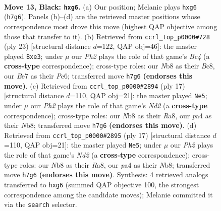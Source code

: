 \documentclass[11pt]{article}
\begin{document}
\clearpage

\begin{figure}[p]\centering
\begin{subfigure}{0.46\textwidth}\centering
\resizebox{\linewidth}{!}{%
\newchessgame
\chessboard[
  setfen={rnbq1rk1/pp1nb2p/4p1P1/8/P2P2P1/2N2N2/1P3P2/R1BQKB1R b KQ - 0 13},
  showmover=false,
  pgfstyle=straightmove, color=movearrow, markmove={h7-g6}
]}
\caption{}
\end{subfigure}\hfill
\begin{subfigure}{0.46\textwidth}\centering
\resizebox{\linewidth}{!}{%
\newchessgame
\chessboard[
  setfen={r1bq1rk1/pp1n2pp/4p3/2b1P3/8/4PN2/PPQN2PP/R3KB1R b KQ - 3 12},
  showmover=false,
  pgfstyle=straightmove, color=movearrow, markmove={c5-e3}
]}
\caption{}
\end{subfigure}
\\[4pt]
\begin{subfigure}{0.46\textwidth}\centering
\resizebox{\linewidth}{!}{%
\newchessgame
\chessboard[
  setfen={rnbqk2r/pp1nppbp/4P1p1/8/3N4/2N5/PPP3PP/R1BQKB1R b KQkq - 0 9},
  showmover=false,
  pgfstyle=straightmove, color=movearrow, markmove={d7-e5}
]}
\caption{}
\end{subfigure}\hfill
\begin{subfigure}{0.46\textwidth}\centering
\resizebox{\linewidth}{!}{%
\newchessgame
\chessboard[
  setfen={rnbqk2r/pp1nppbp/4P1p1/8/3N4/2N5/PPP3PP/R1BQKB1R b KQkq - 0 9},
  showmover=false,
  pgfstyle=straightmove, color=movearrow, markmove={d7-e5}
]}
\caption{}
\end{subfigure}
\caption{\textbf{Move 13, Black: \texttt{hxg6}.} (a) Our position; Melanie plays \texttt{hxg6} (\texttt{h7g6}). Panels (b)--(d) are the retrieved master positions whose correspondence most drove this move (highest QAP objective among those that transfer to it). (b) Retrieved from \texttt{ccrl\_top\_p0000\#728} (ply 23) [structural distance $d$=122, QAP obj=46]: the master played \texttt{Bxe3}; under $\mu$ our \emph{Ph2} plays the role of that game's \emph{Bc4} (a \textbf{cross-type} correspondence); cross-type roles: our \emph{N}b8 as their \emph{B}c8, our \emph{B}e7 as their \emph{P}e6; transferred move \texttt{h7g6} \textbf{(endorses this move)}. (c) Retrieved from \texttt{ccrl\_top\_p0000\#2894} (ply 17) [structural distance $d$=110, QAP obj=21]: the master played \texttt{Ne5}; under $\mu$ our \emph{Ph2} plays the role of that game's \emph{Nd2} (a \textbf{cross-type} correspondence); cross-type roles: our \emph{N}b8 as their \emph{R}a8, our \emph{p}a4 as their \emph{N}b8; transferred move \texttt{h7g6} \textbf{(endorses this move)}. (d) Retrieved from \texttt{ccrl\_top\_p0000\#2895} (ply 17) [structural distance $d$=110, QAP obj=21]: the master played \texttt{Ne5}; under $\mu$ our \emph{Ph2} plays the role of that game's \emph{Nd2} (a \textbf{cross-type} correspondence); cross-type roles: our \emph{N}b8 as their \emph{R}a8, our \emph{p}a4 as their \emph{N}b8; transferred move \texttt{h7g6} \textbf{(endorses this move)}. Synthesis: 4 retrieved analogs transferred to \texttt{hxg6} (summed QAP objective 100, the strongest correspondence among the candidate moves); Melanie committed it via the \texttt{search} selector.}
\label{fig:thought-m25}
\end{figure}
\end{document}
